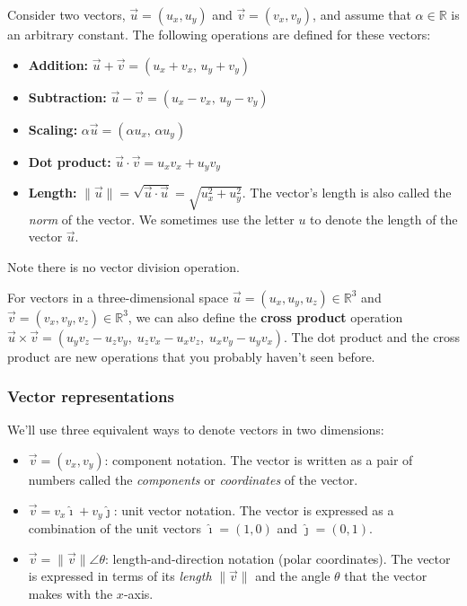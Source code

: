 			Consider two vectors,
			$\vec{u}=(u_x,u_y) $ and $\vec{v}=(v_x,v_y)$,
			and assume that $\alpha \in \mathbb{R}$ is an arbitrary constant. 
			The following operations are defined for these vectors:
			\begin{itemize}
				\item 	\textbf{Addition:}	$\vec{u} + \vec{v} = (u_x+v_x,\, u_y+v_y)$
				\item 	\textbf{Subtraction:}	$\vec{u} - \vec{v} = (u_x-v_x,\, u_y-v_y)$
				\item 	\textbf{Scaling:}		$\alpha \vec{u} = (\alpha u_x,\, \alpha u_y)$
				\item 	\textbf{Dot product:}	$\vec{u} \cdot \vec{v}  = u_xv_x+u_yv_y$								
				\item 	\textbf{Length:}		$\|\vec{u}\| = \sqrt{\vec{u}\cdot\vec{u}} = \sqrt{u_x^2+u_y^2}$.
						The vector's length is also called the \emph{norm} of the vector.
						We sometimes use the letter $u$ to denote the length of the vector $\vec{u}$.
			\end{itemize}

			\noindent
			Note there is no vector division operation.

			For vectors in a three-dimensional space $\vec{u}=(u_x,u_y,u_z) \in \mathbb{R}^3$
			and $\vec{v}=(v_x,v_y,v_z) \in \mathbb{R}^3$,
			we can also define the \textbf{cross product} operation												
			$\vec{u} \times \vec{v} = (u_yv_z-u_zv_y,\; u_zv_x-u_xv_z,\; u_xv_y-u_yv_x)$.
			The dot product and the cross product are new operations that you probably haven't seen before.


		\subsubsection{Vector representations}

			We'll use three equivalent ways to denote vectors in two dimensions:
			\begin{itemize}
			    \item   	$\vec{v} =(v_x, v_y)$: component notation.
					The vector is written as a pair of numbers called the \emph{components} or \emph{coordinates} of the vector.	
			    \item 	$\vec{v} =v_x\hat{\imath}+ v_y\hat{\jmath}$: unit vector notation.
					The vector is expressed as a combination of the unit vectors
					$\hat{\imath} = (1,0)$ and $ \hat{\jmath} = (0,1)$.
			    \item   	$\vec{v}=\|\vec{v}\|\angle \theta$: length-and-direction notation (polar coordinates).
					The vector is expressed in terms of its \emph{length} $\|\vec{v}\|$
					and the angle $\theta$ that the vector makes with the $x$-axis.
			\end{itemize}


